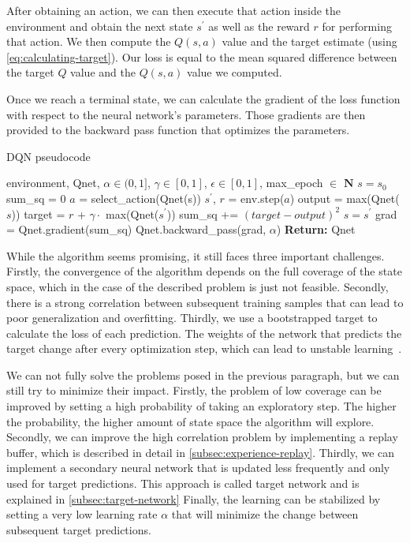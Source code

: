 \documentclass{article}
\begin{document}
After obtaining an action, we can then execute that action inside the environment and obtain the next state $s^\prime$
as well as the reward $r$ for performing that action.
We then compute the $Q(s,a)$ value and the target estimate (using \autoref{eq:calculating-target}).
Our loss is equal to the mean squared difference between the target $Q$ value and the $Q(s,a)$ value we computed.

Once we reach a terminal state, we can calculate the gradient of the loss function with respect to the neural network's parameters.
Those gradients are then provided to the backward pass function that optimizes the parameters.


\begin{algorithm}
   \caption{DQN pseudocode}
   \begin{algorithmic}
      \REQUIRE environment, Qnet, $\alpha \in (0,1]$, $\gamma \in [0,1]$, $\epsilon \in [0,1]$, max\_epoch $\in$ $\mathbf{N}$
      \STATE $s = s_0$ 
         \STATE sum\_sq = 0
            \STATE $a$ = select\_action(Qnet(s))
            \STATE $s^\prime$, $r$ = env.step($a$)
            \STATE output = max(Qnet($s$))
            \STATE target = $r$ + $\gamma \cdot$ max(Qnet($s^\prime$))
            \STATE sum\_sq += $(target - output)^2$
            \STATE $s = s^\prime$
         \ENDWHILE
         \STATE grad = Qnet.gradient(sum\_sq)
         \STATE Qnet.backward\_pass(grad, $\alpha$)
      \ENDFOR
      \STATE \textbf{Return:} Qnet
   \end{algorithmic}
   \label{alg:dqn}
\end{algorithm}

While the algorithm seems promising, it still faces three important challenges.
Firstly, the convergence of the algorithm depends on the full coverage of the state space, which in the case of the described
problem is just not feasible.
Secondly, there is a strong correlation between subsequent training samples that can lead to poor generalization and overfitting.
Thirdly, we use a bootstrapped target to calculate the loss of each prediction.
The weights of the network that predicts the target change after every optimization step, which can lead to unstable learning~\cite{DBLP:books/sp/Plaat22}.

We can not fully solve the problems posed in the previous paragraph, but we can still try to minimize their impact.
Firstly, the problem of low coverage can be improved by setting a high probability of taking an exploratory step.
The higher the probability, the higher amount of state space the algorithm will explore.
Secondly, we can improve the high correlation problem by implementing a replay buffer, which is described in detail in \autoref{subsec:experience-replay}.
Thirdly, we can implement a secondary neural network that is updated less frequently and only used for target predictions.
This approach is called target network and is explained in \autoref{subsec:target-network}
Finally, the learning can be stabilized by setting a very low learning rate $\alpha$ that will minimize the change between
subsequent target predictions.
\end{document}
